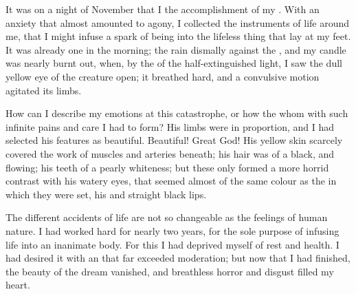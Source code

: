 \documentclass{fiche}
\begin{document}
\begin{texte}
It was on a  night of November that I
 the accomplishment of my
. With an anxiety that almost amounted to agony, I
collected the instruments of life around me, that I might infuse a spark of being into the
lifeless thing that lay at my feet. It was already one in the morning; the rain
 dismally against the
, and my candle was nearly burnt out, when, by the
 of the half-extinguished light, I saw the dull
yellow eye of the creature open; it breathed hard, and a convulsive motion agitated its limbs.

How can I describe my emotions at this catastrophe, or how
 the  whom with such infinite pains and care I had
 to form? His limbs were in proportion, and I had
selected his features as beautiful. Beautiful! Great God! His yellow skin scarcely covered
the work of muscles and arteries beneath; his hair was of a
 black, and flowing; his teeth of a pearly
whiteness; but these  only formed
a more horrid contrast with his watery eyes, that seemed almost of the same colour as the
  in which they
were set, his 
 and straight black lips.

The different accidents of life are not so changeable as the feelings of human nature. I had
worked hard for nearly two years, for the sole purpose of infusing life into an inanimate
body. For this I had deprived myself of rest and health. I had desired it with an
 that far exceeded moderation; but now that I had finished, the
beauty of the dream vanished, and breathless horror and disgust filled my heart.
\end{texte}

\end{document}
